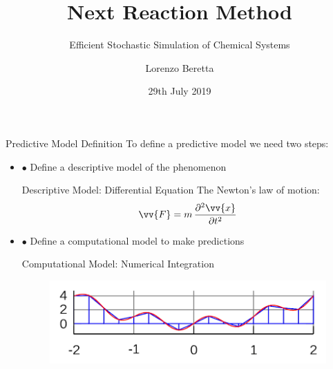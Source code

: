 \documentclass{beamer}
\title{Next Reaction Method}
\subtitle{Efficient Stochastic Simulation of Chemical Systems}
\author{Lorenzo Beretta}
\date{29th July 2019}
\begin{document}
\begin{frame}
  \maketitle
\end{frame}

\begin{frame}{Predictive Model Definition}
  To define a predictive model we need two steps:
  \begin{itemize}
  \item $\bullet$ Define a descriptive model of the phenomenon
    \begin{block}{Descriptive Model: Differential Equation}
      The Newton's law of motion:
      $$ \vv{F} = m \, \frac{\partial^2 \vv{x}}{\partial t^2} $$
    \end{block}    
  \item $\bullet$ Define a computational model to make predictions
    \begin{block}{Computational Model: Numerical Integration}
      \begin{figure}[h]
        \centering
        \includegraphics[scale=0.6]{num_int}
      \end{figure}
    \end{block}
  \end{itemize}
\end{frame}
\end{document}
